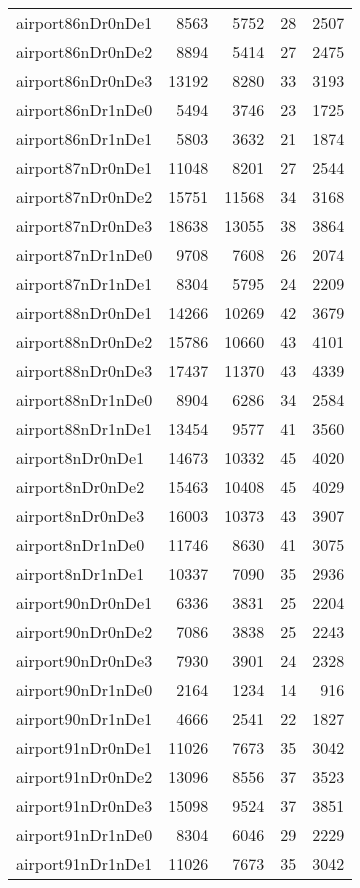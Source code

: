\begin{longtable}{lrrrr}
airport86nDr0nDe1 & 8563 & 5752 & 28 & 2507 \\
airport86nDr0nDe2 & 8894 & 5414 & 27 & 2475 \\
airport86nDr0nDe3 & 13192 & 8280 & 33 & 3193 \\
airport86nDr1nDe0 & 5494 & 3746 & 23 & 1725 \\
airport86nDr1nDe1 & 5803 & 3632 & 21 & 1874 \\
airport87nDr0nDe1 & 11048 & 8201 & 27 & 2544 \\
airport87nDr0nDe2 & 15751 & 11568 & 34 & 3168 \\
airport87nDr0nDe3 & 18638 & 13055 & 38 & 3864 \\
airport87nDr1nDe0 & 9708 & 7608 & 26 & 2074 \\
airport87nDr1nDe1 & 8304 & 5795 & 24 & 2209 \\
airport88nDr0nDe1 & 14266 & 10269 & 42 & 3679 \\
airport88nDr0nDe2 & 15786 & 10660 & 43 & 4101 \\
airport88nDr0nDe3 & 17437 & 11370 & 43 & 4339 \\
airport88nDr1nDe0 & 8904 & 6286 & 34 & 2584 \\
airport88nDr1nDe1 & 13454 & 9577 & 41 & 3560 \\
airport8nDr0nDe1 & 14673 & 10332 & 45 & 4020 \\
airport8nDr0nDe2 & 15463 & 10408 & 45 & 4029 \\
airport8nDr0nDe3 & 16003 & 10373 & 43 & 3907 \\
airport8nDr1nDe0 & 11746 & 8630 & 41 & 3075 \\
airport8nDr1nDe1 & 10337 & 7090 & 35 & 2936 \\
airport90nDr0nDe1 & 6336 & 3831 & 25 & 2204 \\
airport90nDr0nDe2 & 7086 & 3838 & 25 & 2243 \\
airport90nDr0nDe3 & 7930 & 3901 & 24 & 2328 \\
airport90nDr1nDe0 & 2164 & 1234 & 14 & 916 \\
airport90nDr1nDe1 & 4666 & 2541 & 22 & 1827 \\
airport91nDr0nDe1 & 11026 & 7673 & 35 & 3042 \\
airport91nDr0nDe2 & 13096 & 8556 & 37 & 3523 \\
airport91nDr0nDe3 & 15098 & 9524 & 37 & 3851 \\
airport91nDr1nDe0 & 8304 & 6046 & 29 & 2229 \\
airport91nDr1nDe1 & 11026 & 7673 & 35 & 3042 \\

\end{longtable}
